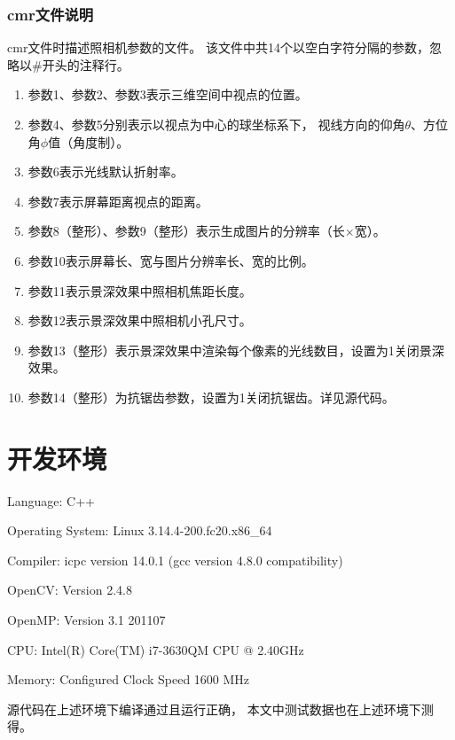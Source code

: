 \subsubsection{cmr文件说明}
cmr文件时描述照相机参数的文件。%
该文件中共14个以空白字符分隔的参数，忽略以\#开头的注释行。
\begin{enumerate}
\item
参数1、参数2、参数3表示三维空间中视点的位置。
\item
参数4、参数5分别表示以视点为中心的球坐标系下，%
视线方向的仰角$\theta$、方位角$\phi$值（角度制）。
\item
参数6表示光线默认折射率。
\item
参数7表示屏幕距离视点的距离。
\item
参数8（整形）、参数9（整形）表示生成图片的分辨率（长$\times$宽）。
\item
参数10表示屏幕长、宽与图片分辨率长、宽的比例。
\item
参数11表示景深效果中照相机焦距长度。
\item
参数12表示景深效果中照相机小孔尺寸。
\item
参数13（整形）表示景深效果中渲染每个像素的光线数目，设置为1关闭景深效果。
\item
参数14（整形）为抗锯齿参数，设置为1关闭抗锯齿。详见源代码。
\end{enumerate}

\section{开发环境}
Language: C++

Operating System: Linux 3.14.4-200.fc20.x86\_64

Compiler: icpc version 14.0.1 (gcc version 4.8.0 compatibility)

OpenCV: Version 2.4.8

OpenMP: Version 3.1 201107

CPU: Intel(R) Core(TM) i7-3630QM CPU @ 2.40GHz

Memory: Configured Clock Speed 1600 MHz 


源代码在上述环境下编译通过且运行正确，%
本文中测试数据也在上述环境下测得。

